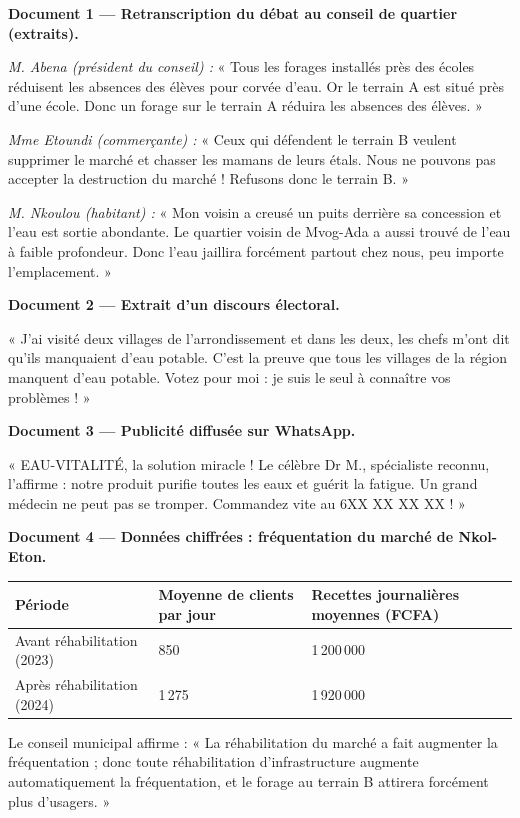\documentclass[11pt]{article}
\begin{document}
\textbf{Document 1 — Retranscription du débat au conseil de quartier (extraits).}

\emph{M. Abena (président du conseil) :} « Tous les forages installés près des écoles réduisent les absences des élèves pour corvée d'eau. Or le terrain A est situé près d'une école. Donc un forage sur le terrain A réduira les absences des élèves. »

\emph{Mme Etoundi (commerçante) :} « Ceux qui défendent le terrain B veulent supprimer le marché et chasser les mamans de leurs étals. Nous ne pouvons pas accepter la destruction du marché ! Refusons donc le terrain B. »

\emph{M. Nkoulou (habitant) :} « Mon voisin a creusé un puits derrière sa concession et l'eau est sortie abondante. Le quartier voisin de Mvog-Ada a aussi trouvé de l'eau à faible profondeur. Donc l'eau jaillira forcément partout chez nous, peu importe l'emplacement. »

\textbf{Document 2 — Extrait d'un discours électoral.}

« J'ai visité deux villages de l'arrondissement et dans les deux, les chefs m'ont dit qu'ils manquaient d'eau potable. C'est la preuve que tous les villages de la région manquent d'eau potable. Votez pour moi : je suis le seul à connaître vos problèmes ! »

\textbf{Document 3 — Publicité diffusée sur WhatsApp.}

« EAU-VITALITÉ, la solution miracle ! Le célèbre Dr M., spécialiste reconnu, l'affirme : notre produit purifie toutes les eaux et guérit la fatigue. Un grand médecin ne peut pas se tromper. Commandez vite au 6XX XX XX XX ! »

\textbf{Document 4 — Données chiffrées : fréquentation du marché de Nkol-Eton.}

\begin{center}
\begin{tabularx}{\linewidth}{|l|X|X|}\hline
\rowcolor{popblueL} \textbf{Période} & \textbf{Moyenne de clients par jour} & \textbf{Recettes journalières moyennes (FCFA)} \\ \hline
Avant réhabilitation (2023) & 850 & 1\,200\,000 \\ \hline
Après réhabilitation (2024) & 1\,275 & 1\,920\,000 \\ \hline
\end{tabularx}
\end{center}

Le conseil municipal affirme : « La réhabilitation du marché a fait augmenter la fréquentation ; donc toute réhabilitation d'infrastructure augmente automatiquement la fréquentation, et le forage au terrain B attirera forcément plus d'usagers. »
\end{document}

